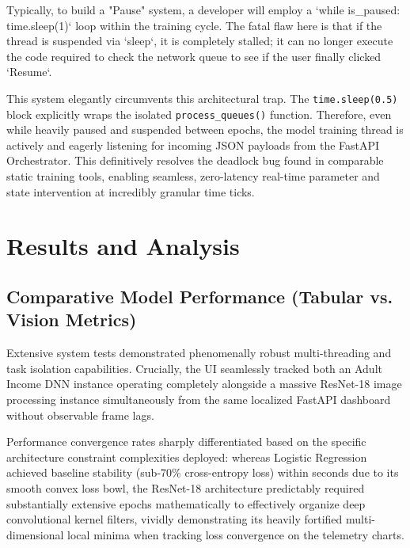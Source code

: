\documentclass[12pt,a4paper]{article}
\begin{document}
Typically, to build a "Pause" system, a developer will employ a `while is_paused: time.sleep(1)` loop within the training cycle. The fatal flaw here is that if the thread is suspended via `sleep`, it is completely stalled; it can no longer execute the code required to check the network queue to see if the user finally clicked `Resume`. 

This system elegantly circumvents this architectural trap. The \texttt{time.sleep(0.5)} block explicitly wraps the isolated \texttt{process\_queues()} function. Therefore, even while heavily paused and suspended between epochs, the model training thread is actively and eagerly listening for incoming JSON payloads from the FastAPI Orchestrator. This definitively resolves the deadlock bug found in comparable static training tools, enabling seamless, zero-latency real-time parameter and state intervention at incredibly granular time ticks.

\section{Results and Analysis}

\subsection{Comparative Model Performance (Tabular vs. Vision Metrics)}
Extensive system tests demonstrated phenomenally robust multi-threading and task isolation capabilities. Crucially, the UI seamlessly tracked both an Adult Income DNN instance operating completely alongside a massive ResNet-18 image processing instance simultaneously from the same localized FastAPI dashboard without observable frame lags. 

Performance convergence rates sharply differentiated based on the specific architecture constraint complexities deployed: whereas Logistic Regression achieved baseline stability (sub-70\% cross-entropy loss) within seconds due to its smooth convex loss bowl, the ResNet-18 architecture predictably required substantially extensive epochs mathematically to effectively organize deep convolutional kernel filters, vividly demonstrating its heavily fortified multi-dimensional local minima when tracking loss convergence on the telemetry charts.
\end{document}

